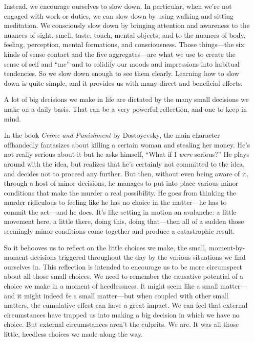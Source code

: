 Instead, we encourage ourselves to slow down. In particular, when we're 
not engaged with work or duties, we can slow down by using walking and 
sitting meditation. We consciously slow down by bringing attention and 
awareness to the nuances of sight, smell, taste, touch, mental objects, 
and to the nuances of body, feeling, perception, mental formations, and 
consciousness. Those things---the six kinds of sense contact and the 
five aggregates---are what we use to create the sense of self and 
``me'' and to solidify our moods and impressions into habitual 
tendencies. So we slow down enough to see them clearly. Learning how to 
slow down is quite simple, and it provides us with many direct and 
beneficial effects.


A lot of big decisions we make in life are dictated by the many small 
decisions we make on a daily basis. That can be a very powerful 
reflection, and one to keep in mind.

In the book \emph{Crime and Punishment} by Dostoyevsky, the main 
character offhandedly fantasizes about killing a certain woman and 
stealing her money. He's not really serious about it but he asks 
himself, ``What if I \emph{were} serious?'' He plays around with the 
idea, but realizes that he's certainly not committed to the idea, and 
decides not to proceed any further. But then, without even being aware 
of it, through a host of minor decisions, he manages to put into place 
various minor conditions that make the murder a real possibility. He 
goes from thinking the murder ridiculous to feeling like he has no 
choice in the matter---he has to commit the act---and he does. It's 
like setting in motion an avalanche: a little movement here, a little 
there, doing this, doing that---then all of a sudden those seemingly 
minor conditions come together and produce a catastrophic result.

So it behooves us to reflect on the little choices we make, the small,
moment-by-moment decisions triggered throughout the day by the various
situations we find ourselves in. This reflection is intended to
encourage us to be more circumspect about all those small choices. We
need to remember the causative potential of a choice we make in a moment
of heedlessness. It might seem like a small matter---and it might
\mbox{indeed} \emph{be} a small matter---but when coupled with other
small matters, the cumulative effect can have a great impact. We can
feel that external circumstances have trapped us into making a big
decision in which we have no choice. But external circumstances aren't
the culprits. We are. It was all those little, heedless choices we made
along the way.

